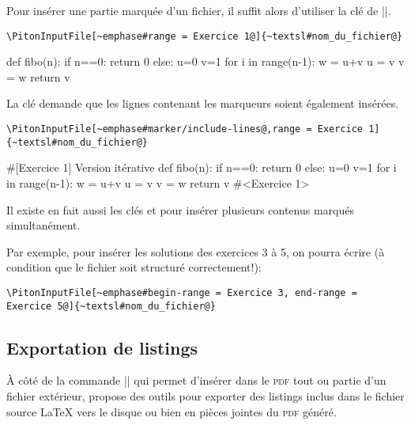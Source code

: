 \documentclass[dvipsnames,svgnames]{article}
\begin{document}
\bigskip
Pour insérer une partie marquée d'un fichier, il suffit alors d'utiliser la clé
 de |\PitonInputFile|.

\smallskip
\begin{Verbatim}
\PitonInputFile[~emphase#range = Exercice 1@]{~textsl#nom_du_fichier@}
\end{Verbatim}

\medskip
\begin{Piton}
def fibo(n):
    if n==0: return 0 
    else:
        u=0
        v=1
        for i in range(n-1):
            w = u+v
            u = v
            v = w
        return v
\end{Piton}

\vspace{1cm}  La clé  demande
que les lignes contenant les marqueurs soient également insérées.

\begin{Verbatim}
\PitonInputFile[~emphase#marker/include-lines@,range = Exercice 1]{~textsl#nom_du_fichier@}
\end{Verbatim}

\begin{Piton}
#[Exercice 1] Version itérative
def fibo(n):
    if n==0: return 0 
    else:
        u=0
        v=1
        for i in range(n-1):
            w = u+v
            u = v
            v = w
        return v
#<Exercice 1>
\end{Piton}


\bigskip
{}  Il existe en fait aussi les clés
 et  pour insérer plusieurs contenus marqués
simultanément.

Par exemple, pour insérer les solutions des exercices 3 à 5, on pourra écrire (à condition
que le fichier soit structuré correctement!):

\begin{Verbatim}
\PitonInputFile[~emphase#begin-range = Exercice 3, end-range = Exercice 5@]{~textsl#nom_du_fichier@}
\end{Verbatim}


\subsection{Exportation de listings}

À côté de la commande |\PitonInputFile| qui permet d'insérer dans le \textsc{pdf} 
tout ou partie d'un fichier extérieur,  propose des outils pour exporter
des listings inclus dans le fichier source LaTeX vers le disque ou bien en pièces jointes
du \textsc{pdf} généré.
\end{document}
